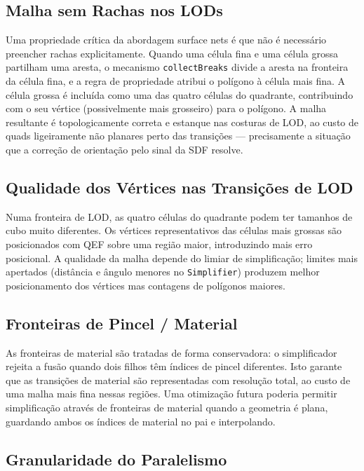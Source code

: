 \documentclass[10pt,a4paper]{article}
\begin{document}
\subsection{Malha sem Rachas nos LODs}

Uma propriedade crítica da abordagem surface nets é que não é
necessário preencher rachas explicitamente. Quando uma célula fina
e uma célula grossa partilham uma aresta, o mecanismo
\lstinline{collectBreaks} divide a aresta na fronteira da célula fina,
e a regra de propriedade atribui o polígono à célula mais fina. A
célula grossa é incluída como uma das quatro células do quadrante,
contribuindo com o seu vértice (possivelmente mais grosseiro) para
o polígono. A malha resultante é topologicamente correta e estanque
nas costuras de LOD, ao custo de quads ligeiramente não planares
perto das transições — precisamente a situação que a correção de
orientação pelo sinal da SDF resolve.

\subsection{Qualidade dos Vértices nas Transições de LOD}

Numa fronteira de LOD, as quatro células do quadrante podem ter
tamanhos de cubo muito diferentes. Os vértices representativos das
células mais grossas são posicionados com QEF sobre uma região maior,
introduzindo mais erro posicional. A qualidade da malha depende do
limiar de simplificação; limites mais apertados (distância e ângulo
menores no \lstinline{Simplifier}) produzem melhor posicionamento dos
vértices mas contagens de polígonos maiores.

\subsection{Fronteiras de Pincel / Material}

As fronteiras de material são tratadas de forma conservadora: o
simplificador rejeita a fusão quando dois filhos têm índices de
pincel diferentes. Isto garante que as transições de material são
representadas com resolução total, ao custo de uma malha mais fina
nessas regiões. Uma otimização futura poderia permitir simplificação
através de fronteiras de material quando a geometria é plana,
guardando ambos os índices de material no pai e interpolando.

\subsection{Granularidade do Paralelismo}
\end{document}
